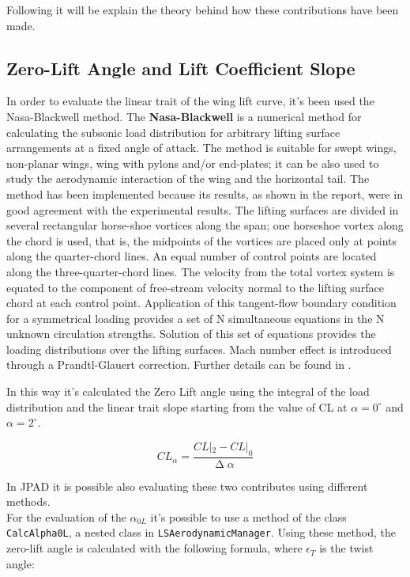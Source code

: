 Following it will be explain the theory behind how these contributions have been made.

\subsection{Zero-Lift Angle and Lift Coefficient Slope}

In order to evaluate the linear trait of the wing lift curve, it's been used the Nasa-Blackwell method. The {\bfseries Nasa-Blackwell} is a numerical method for calculating the subsonic load distribution for arbitrary lifting surface arrangements at a fixed angle of attack. The method is suitable for swept wings, non-planar wings, wing with pylons and/or end-plates; it can be also used to study the aerodynamic interaction of the wing and the horizontal tail. The method has been implemented because its results, as shown in the report, were in good agreement with the experimental results.
The lifting surfaces are divided in several rectangular horse-shoe vortices along the span; one horseshoe vortex along the chord is used, that is, the midpoints of the vortices are placed only at points along the quarter-chord lines. An equal number of control points are located along the three-quarter-chord lines. The velocity from the total vortex system is equated to the component of free-stream velocity normal to the lifting surface chord at each control point. Application of this tangent-flow boundary condition for a symmetrical loading provides a set of N simultaneous equations in the N unknown circulation strengths. Solution of this set of equations provides the loading distributions over the lifting surfaces. Mach number effect is introduced through a Prandtl-Glauert correction. Further details can be found in \cite{NASA:Blackwell}.

In this way it's calculated the Zero Lift angle using the integral of the load distribution and the linear trait slope starting from the value of CL at $\alpha =  0^{\circ}$ and $\alpha = 2^{\circ}$.

\begin{equation}
CL_{\alpha}= \frac{CL|_2 - CL|_0}{\upDelta \alpha}
\end{equation}

In JPAD it is possible also evaluating these two contributes using different methods. \\
For the evaluation of the $\alpha_{0L}$ it's possible to use a method of the class \texttt{CalcAlpha0L}, a nested class  in \texttt{LSAerodynamicManager}. Using these method, the zero-lift angle is calculated with the following formula, where $\epsilon_T$ is the twist angle:

